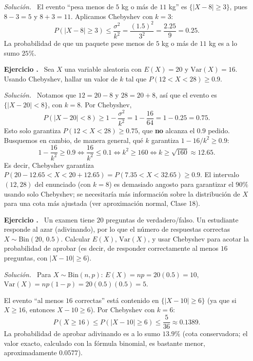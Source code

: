 \documentclass[11pt,a4paper]{article}
\newcounter{ejnum}
\newenvironment{ejercicio}{\refstepcounter{ejnum}\par\medskip\noindent\textbf{Ejercicio \theejnum.}~}{\par}
\newenvironment{solucion}{\par\noindent\textit{Solución.}~}{\par\vspace{1em}}
\begin{document}
\begin{solucion}
El evento ``pesa menos de $5$ kg o más de $11$ kg'' es $\{|X-8|\geq 3\}$, pues $8-3=5$ y $8+3=11$. Aplicamos Chebyshev con $k=3$:
\[
P(|X-8|\geq 3) \leq \frac{\sigma^2}{k^2} = \frac{(1.5)^2}{3^2} = \frac{2.25}{9} = 0.25.
\]
La probabilidad de que un paquete pese menos de $5$ kg o más de $11$ kg es a lo sumo $25\%$.
\end{solucion}

\begin{ejercicio}
Sea $X$ una variable aleatoria con $E(X)=20$ y $\text{Var}(X)=16$. Usando Chebyshev, hallar un valor de $k$ tal que $P(12 < X < 28) \geq 0.9$.
\end{ejercicio}

\begin{solucion}
Notamos que $12 = 20-8$ y $28=20+8$, así que el evento es $\{|X-20|<8\}$, con $k=8$. Por Chebyshev,
\[
P(|X-20|<8) \geq 1 - \frac{\sigma^2}{k^2} = 1-\frac{16}{64} = 1-0.25 = 0.75.
\]
Esto solo garantiza $P(12<X<28)\geq 0.75$, que \textbf{no} alcanza el $0.9$ pedido. Busquemos en cambio, de manera general, qué $k$ garantiza $1-16/k^2 \geq 0.9$:
\[
1 - \frac{16}{k^2} \geq 0.9 \iff \frac{16}{k^2}\leq 0.1 \iff k^2 \geq 160 \iff k \geq \sqrt{160}\approx 12.65.
\]
Es decir, Chebyshev garantiza $P(20-12.65 < X < 20+12.65) = P(7.35<X<32.65) \geq 0.9$. El intervalo $(12,28)$ del enunciado (con $k=8$) es demasiado angosto para garantizar el $90\%$ usando solo Chebyshev; se necesitaría más información sobre la distribución de $X$ para una cota más ajustada (ver aproximación normal, Clase 18).
\end{solucion}

\begin{ejercicio}
Un examen tiene $20$ preguntas de verdadero/falso. Un estudiante responde al azar (adivinando), por lo que el número de respuestas correctas $X\sim\text{Bin}(20,\,0.5)$. Calcular $E(X)$, $\text{Var}(X)$, y usar Chebyshev para acotar la probabilidad de aprobar (es decir, de responder correctamente al menos $16$ preguntas, con $|X-10|\geq 6$).
\end{ejercicio}

\begin{solucion}
Para $X\sim\text{Bin}(n,p)$: $E(X)=np=20(0.5)=10$, $\text{Var}(X)=np(1-p)=20(0.5)(0.5)=5$.

\medskip
El evento ``al menos $16$ correctas'' está contenido en $\{|X-10|\geq 6\}$ (ya que si $X\geq16$, entonces $X-10\geq6$). Por Chebyshev con $k=6$:
\[
P(X\geq 16) \leq P(|X-10|\geq 6) \leq \frac{5}{36} \approx 0.1389.
\]
La probabilidad de aprobar adivinando es a lo sumo $13.9\%$ (cota conservadora; el valor exacto, calculado con la fórmula binomial, es bastante menor, aproximadamente $0.0577$).
\end{solucion}
\end{document}
